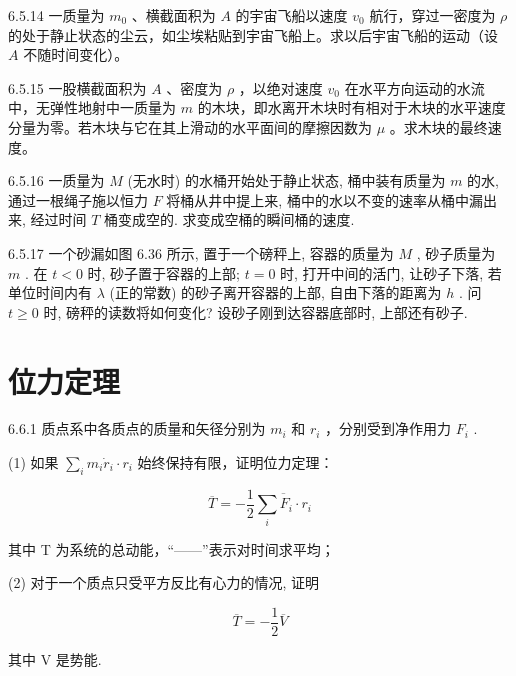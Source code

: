\begin{problem}{6.5.14}
一质量为 $m_0$ 、横截面积为 $A$ 的宇宙飞船以速度 $v_0$ 航行，穿过一密度为 $\rho$ 的处于静止状态的尘云，如尘埃粘贴到宇宙飞船上。求以后宇宙飞船的运动（设 $A$ 不随时间变化）。
\begin{center}

\end{center}
\end{problem}
\clearpage


\begin{problem}{6.5.15}
一股横截面积为 $A$ 、密度为 $\rho$ ，以绝对速度 $v_0$ 在水平方向运动的水流中，无弹性地射中一质量为 $m$ 的木块，即水离开木块时有相对于木块的水平速度分量为零。若木块与它在其上滑动的水平面间的摩擦因数为 $\mu$ 。求木块的最终速度。
\end{problem}
\clearpage


\begin{problem}{6.5.16}
一质量为 $M$ (无水时) 的水桶开始处于静止状态, 桶中装有质量为 $m$ 的水, 通过一根绳子施以恒力 $F$ 将桶从井中提上来, 桶中的水以不变的速率从桶中漏出来, 经过时间 $T$ 桶变成空的. 求变成空桶的瞬间桶的速度.
\end{problem}
\clearpage


\begin{problem}{6.5.17}
一个砂漏如图 6.36 所示, 置于一个磅秤上, 容器的质量为 $M$ , 砂子质量为 $m$ . 在 $t < 0$ 时, 砂子置于容器的上部; $t = 0$ 时, 打开中间的活门, 让砂子下落, 若单位时间内有 $\lambda$ (正的常数) 的砂子离开容器的上部, 自由下落的距离为 $h$ . 问 $t \geqslant 0$ 时, 磅秤的读数将如何变化? 设砂子刚到达容器底部时, 上部还有砂子.
\begin{center}

\end{center}
\end{problem}
\clearpage


\section{位力定理}

\begin{problem}{6.6.1}
质点系中各质点的质量和矢径分别为 $m_{i}$ 和 $r_{i}$ ，分别受到净作用力 $F_{i}$ .

(1) 如果 $\sum_{i} m_{i} \dot{r}_{i} \cdot r_{i}$ 始终保持有限，证明位力定理：

\[
\overline {{{T}}} = - \frac {1}{2} \overline {{{\sum_ {i} F _ {i} \cdot r _ {i}}}}
\]

其中 T 为系统的总动能，“——”表示对时间求平均；

(2) 对于一个质点只受平方反比有心力的情况, 证明

\[
\overline {{T}} = - \frac {1}{2} \overline {{V}}
\]

其中 V 是势能.
\end{problem}
\clearpage


